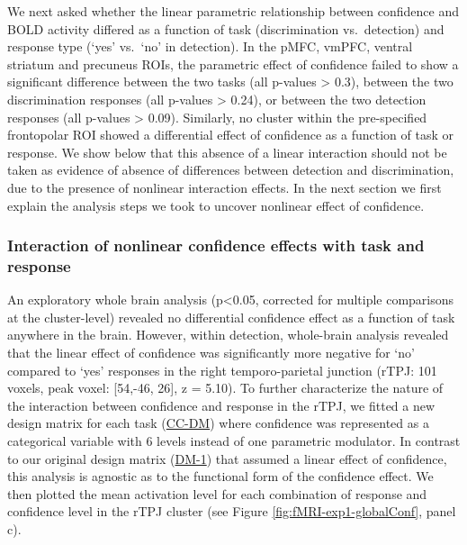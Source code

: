 \documentclass[12pt,twoside]{reedthesis}
\begin{document}
We next asked whether the linear parametric relationship between confidence and BOLD activity differed as a function of task (discrimination vs.~detection) and response type (`yes' vs.~`no' in detection). In the pMFC, vmPFC, ventral striatum and precuneus ROIs, the parametric effect of confidence failed to show a significant difference between the two tasks (all p-values \textgreater{} 0.3), between the two discrimination responses (all p-values \textgreater{} 0.24), or between the two detection responses (all p-values \textgreater{} 0.09). Similarly, no cluster within the pre-specified frontopolar ROI showed a differential effect of confidence as a function of task or response. We show below that this absence of a linear interaction should not be taken as evidence of absence of differences between detection and discrimination, due to the presence of nonlinear interaction effects. In the next section we first explain the analysis steps we took to uncover nonlinear effect of confidence.

\hypertarget{interaction-of-nonlinear-confidence-effects-with-task-and-response}{%
\subsubsection*{Interaction of nonlinear confidence effects with task and response}\label{interaction-of-nonlinear-confidence-effects-with-task-and-response}}

An exploratory whole brain analysis (p\textless0.05, corrected for multiple comparisons at the cluster-level) revealed no differential confidence effect as a function of task anywhere in the brain. However, within detection, whole-brain analysis revealed that the linear effect of confidence was significantly more negative for `no' compared to `yes' responses in the right temporo-parietal junction (rTPJ: 101 voxels, peak voxel: {[}54,-46, 26{]}, z = 5.10). To further characterize the nature of the interaction between confidence and response in the rTPJ, we fitted a new design matrix for each task (\protect\hyperlink{categoricalDM}{CC-DM}) where confidence was represented as a categorical variable with 6 levels instead of one parametric modulator. In contrast to our original design matrix (\protect\hyperlink{DM-1}{DM-1}) that assumed a linear effect of confidence, this analysis is agnostic as to the functional form of the confidence effect. We then plotted the mean activation level for each combination of response and confidence level in the rTPJ cluster (see Figure \ref{fig:fMRI-exp1-globalConf}, panel c).
\end{document}
